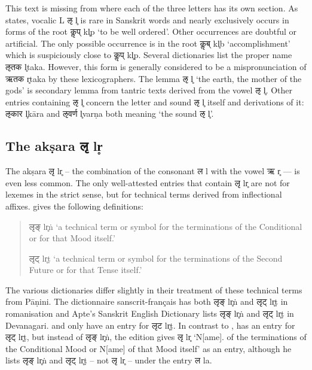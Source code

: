 This text is missing from \citet{mw} where each of the three letters has its own section. As \citet{mw72} states, vocalic L {\devfont ऌ} l̥ is rare in Sanskrit words and nearly exclusively occurs in forms of the root {\devfont कॢप्} kl̥p ‘to be well ordered’. Other occurrences are doubtful or artificial. The only possible occurrence is in the root {\devfont कॢब्} kl̥b ‘accomplishment’ which is suspiciously close to  {\devfont कॢप्} kl̥p. Several dictionaries list the proper name {\devfont ऌतक} l̥taka. However, this form is generally considered to be a mispronunciation of {\devfont ऋतक} r̥taka by these lexicographers. The lemma {\devfont ऌ} l̥ ‘the earth, the mother of the gods’ is secondary lemma from tantric texts derived from the vowel  {\devfont ऌ} l̥. Other entries containing {\devfont ऌ} l̥ concern the letter and sound {\devfont ऌ} l̥ itself and derivations of it: {\devfont ऌकार} l̥kāra and {\devfont ऌवर्ण} l̥varṇa both meaning ‘the sound {\devfont ऌ} l̥’.

\subsection{The akṣara {\devhmfont लृ} lr̥}

The akṣara {\devfont लृ} lr̥ – the combination of the consonant {\devfont ल} l with the vowel {\devfont ऋ} r̥ — is even less common. The only well-attested entries that contain {\devfont लृ} lr̥ are not for lexemes in the strict sense, but for technical terms derived from inflectional affixes. \citet{mw72} gives the following definitions:

\begin{quote}
{\devbfont लृङ्} lr̥ṅ ‘a technical term or symbol for the terminations of the Conditional or for that Mood itself.’ 

{\devbfont लृट्} lr̥ṭ ‘a technical term or symbol for the terminations of the Second Future or for that Tense itself.’ 
\end{quote}


The various dictionaries differ slightly in their treatment of these technical terms from Pāṇini. The dictionnaire sanscrit-français \citep{stc} has both {\devfont लृङ्} lr̥ṅ and {\devfont लृट्} lr̥ṭ  in romanisation and Apte’s Sanskrit English Dictionary \citep{ap90} lists {\devfont लृङ्} lr̥ṅ and {\devfont लृट्} lr̥ṭ in Devanagari. \citet{ccs,cae}  and \citet{md} only have an entry for {\devfont लृट} lr̥ṭ. In contrast to \citet{mw72}, \citet{mw} has an entry for {\devfont लृट्} lr̥ṭ, but instead of {\devfont लृङ्} lr̥ṅ, the \citet{mw} edition gives {\devfont लृ} lr̥ ‘N[ame]. of the terminations of the Conditional Mood or N[ame] of that Mood itself’ as an entry, although he lists {\devfont लृङ्} lr̥ṅ and {\devfont लृट्} lr̥ṭ – not {\devfont लृ} lr̥ – under the entry {\devfont ल} la. 

